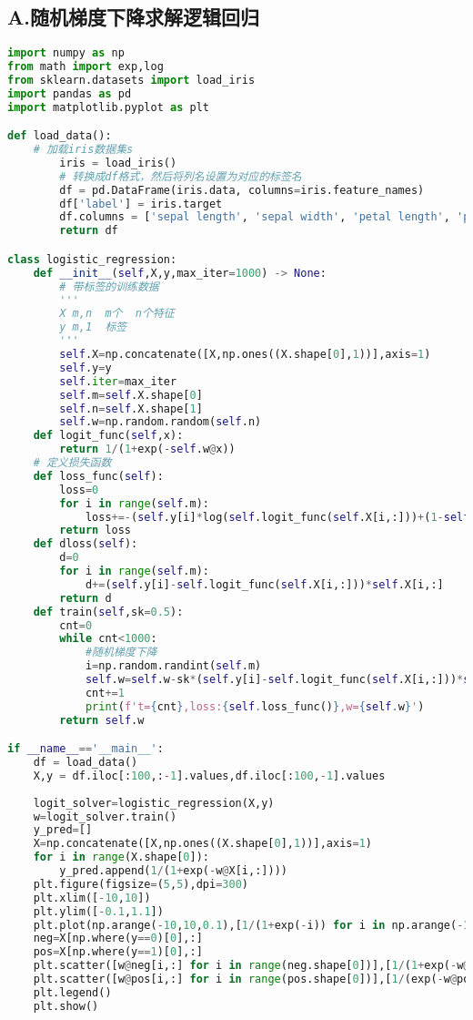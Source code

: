 \documentclass[twoside]{article}
\begin{document}
\subsection*{A.随机梯度下降求解逻辑回归}
\label{GD}
\lstset{breaklines}
\begin{lstlisting}[language={python}]
import numpy as np
from math import exp,log
from sklearn.datasets import load_iris
import pandas as pd
import matplotlib.pyplot as plt

def load_data():
    # 加载iris数据集s
        iris = load_iris()
        # 转换成df格式，然后将列名设置为对应的标签名
        df = pd.DataFrame(iris.data, columns=iris.feature_names)
        df['label'] = iris.target
        df.columns = ['sepal length', 'sepal width', 'petal length', 'petal width', 'label']
        return df

class logistic_regression:
    def __init__(self,X,y,max_iter=1000) -> None:
        # 带标签的训练数据
        '''
        X m,n  m个  n个特征
        y m,1  标签 
        '''
        self.X=np.concatenate([X,np.ones((X.shape[0],1))],axis=1)
        self.y=y
        self.iter=max_iter
        self.m=self.X.shape[0]
        self.n=self.X.shape[1]
        self.w=np.random.random(self.n)
    def logit_func(self,x):
        return 1/(1+exp(-self.w@x))
    # 定义损失函数
    def loss_func(self):
        loss=0
        for i in range(self.m):
            loss+=-(self.y[i]*log(self.logit_func(self.X[i,:]))+(1-self.y[i])*log(1-self.logit_func(self.X[i,:])))
        return loss
    def dloss(self):
        d=0
        for i in range(self.m):
            d+=(self.y[i]-self.logit_func(self.X[i,:]))*self.X[i,:]
        return d
    def train(self,sk=0.5):
        cnt=0
        while cnt<1000:
            #随机梯度下降
            i=np.random.randint(self.m)
            self.w=self.w-sk*(self.y[i]-self.logit_func(self.X[i,:]))*self.X[i,:]
            cnt+=1
            print(f't={cnt},loss:{self.loss_func()},w={self.w}')
        return self.w

if __name__=='__main__':
    df = load_data()
    X,y = df.iloc[:100,:-1].values,df.iloc[:100,-1].values
    
    logit_solver=logistic_regression(X,y)
    w=logit_solver.train()
    y_pred=[]
    X=np.concatenate([X,np.ones((X.shape[0],1))],axis=1)
    for i in range(X.shape[0]):
        y_pred.append(1/(1+exp(-w@X[i,:])))
    plt.figure(figsize=(5,5),dpi=300)
    plt.xlim([-10,10])
    plt.ylim([-0.1,1.1])
    plt.plot(np.arange(-10,10,0.1),[1/(1+exp(-i)) for i in np.arange(-10,10,0.1)])
    neg=X[np.where(y==0)[0],:]
    pos=X[np.where(y==1)[0],:]
    plt.scatter([w@neg[i,:] for i in range(neg.shape[0])],[1/(1+exp(-w@neg[i,:])) for i in range(neg.shape[0])],color='r',marker='o',label='y=1')
    plt.scatter([w@pos[i,:] for i in range(pos.shape[0])],[1/(exp(-w@pos[i,:])) for i in range(pos.shape[0])],color='b',marker='*',label='y=0')
    plt.legend()
    plt.show()

\end{lstlisting}
\end{document}
